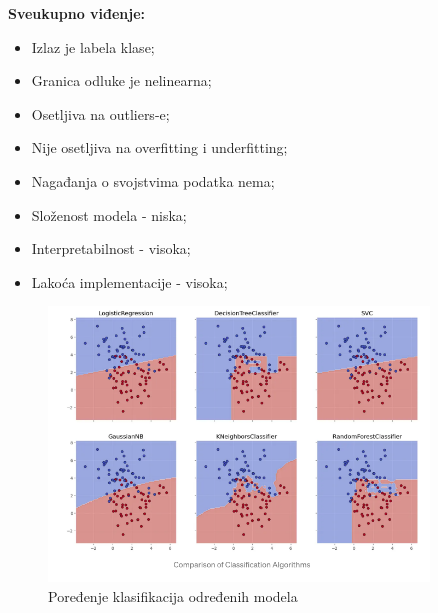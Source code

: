\documentclass[fontsize=12bp, paper=a4]{scrarticle}
\begin{document}
\textbf{Sveukupno viđenje:}
\begin{itemize}
    \item Izlaz je labela klase;
    \item Granica odluke je nelinearna;
    \item Osetljiva na outliers-e;
    \item Nije osetljiva na overfitting i underfitting;
    \item Nagađanja o svojstvima podatka nema;
    \item Složenost modela - niska;
    \item Interpretabilnost - visoka;
    \item Lakoća implementacije - visoka;
\end{itemize}





\begin{figure}[h!]
    \centering
    \includegraphics[width=0.9\textwidth]{image-34.png}
    \caption{Poređenje klasifikacija određenih modela}
\end{figure}
\end{document}
